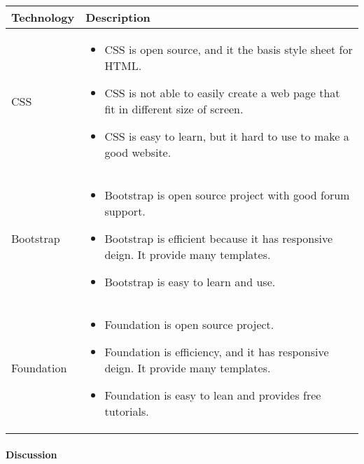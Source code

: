 \begin{center}
    \begin{tabular}{ | l | p{10cm} |}
      \hline
      Technology & Description  \\ \hline
      CSS \cite{CSS_intro}&
      \begin{itemize}
        \item CSS is open source, and it the basis style sheet for HTML.
        \item CSS is not able to easily create a web page that fit in different size of screen.
        \item CSS is easy to learn, but it hard to use to make a good website.
      \end{itemize} \\ \hline

      Bootstrap \cite{boot_intro}&
      \begin{itemize}
        \item Bootstrap is open source project with good forum support.
        \item Bootstrap is efficient because it has responsive deign. It provide many templates.
        \item Bootstrap is easy to learn and use.
      \end{itemize} \\ \hline

      Foundation \cite{foundation_intro}&
      \begin{itemize}
        \item Foundation is open source project.
        \item Foundation is efficiency, and it has responsive deign. It provide many templates.
        \item Foundation is easy to lean and provides free tutorials.
      \end{itemize} \\ \hline

    \end{tabular}
\end{center}

\paragraph{Discussion}

